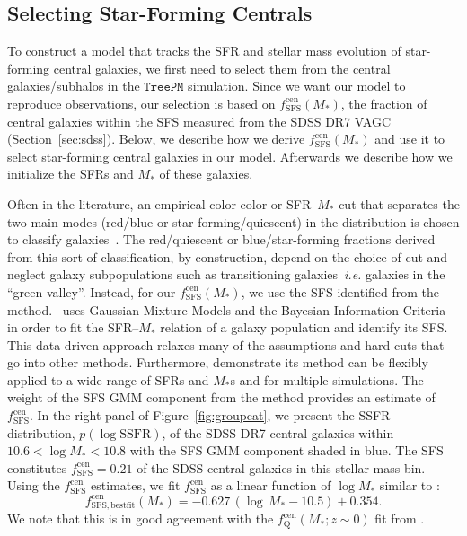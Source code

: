 \documentclass[12pt, letterpaper, preprint, tighten]{aastex62}
\newcommand{\beq}{\begin{equation}}
\newcommand{\eeq}{\end{equation}}
\begin{document}
\subsection{Selecting Star-Forming Centrals}  \label{sec:sfcen}
To construct a model that tracks the SFR and stellar mass evolution of 
star-forming central galaxies, we first need to select them from the 
central galaxies/subhalos in the $\mathtt{TreePM}$ simulation. Since 
we want our model to reproduce observations, our selection is based 
on $f^\mathrm{cen}_\mathrm{SFS}(M_*)$, the fraction of central galaxies 
within the SFS measured from the SDSS DR7 VAGC (Section~\ref{sec:sdss}). 
Below, we describe how we derive $f^\mathrm{cen}_\mathrm{SFS}(M_*)$ and 
use it to select star-forming central galaxies in our model. Afterwards 
we describe how we initialize the SFRs and $M_*$ of these galaxies.

Often in the literature, an empirical color-color or SFR--$M_*$ cut 
that separates the two main modes (red/blue or star-forming/quiescent) 
in the distribution is chosen to classify 
galaxies~\citep[\emph{e.g.}][]{baldry2006, blanton2009, drory2009, peng2010, moustakas2013, hahn2015}.
The red/quiescent or blue/star-forming fractions derived from this sort 
of classification, by construction, depend on the choice of cut and 
neglect galaxy subpopulations such as transitioning galaxies~\emph{i.e.} 
galaxies in the ``green valley''. Instead, for our $f^\mathrm{cen}_\mathrm{SFS}(M_*)$, 
we use the SFS identified from the \cite{hahn2018a} method. \cite{hahn2018a}~uses Gaussian 
Mixture Models and the Bayesian Information Criteria in order to fit the 
SFR--$M_*$ relation of a galaxy population and identify its SFS. This 
data-driven approach relaxes many of the assumptions and hard cuts that 
go into other methods. Furthermore, \cite{hahn2018a} demonstrate its method can 
be flexibly applied to a wide range of SFRs and $M_*$s and for multiple 
simulations. The weight of the SFS GMM component from the method provides 
an estimate of $f^\mathrm{cen}_\mathrm{SFS}$. In the right panel of 
Figure~\ref{fig:groupcat}, we present the SSFR distribution, $p(\log \mathrm{SSFR})$,
of the SDSS DR7 central galaxies within $10.6 < \log M_* < 10.8$ with 
the SFS GMM component shaded in blue. 
The SFS constitutes $f^\mathrm{cen}_\mathrm{SFS} = 0.21$ of the SDSS 
central galaxies in this stellar mass bin. Using the $f^\mathrm{cen}_\mathrm{SFS}$ 
estimates, we fit $f^\mathrm{cen}_\mathrm{SFS}$ as a linear function of 
$\log M_*$ similar to \cite{wetzel2013,hahn2017}: 
\beq \label{eq:f_cen_sfms}
f^\mathrm{cen}_\mathrm{SFS, bestfit}(M_*) = -0.627\,(\log\,M_* - 10.5) + 0.354. 
\eeq
We note that this is in good agreement with the $f_\mathrm{Q}^\mathrm{cen}(M_*; z \sim 0)$ 
fit from \cite{hahn2017}. 
\end{document}
